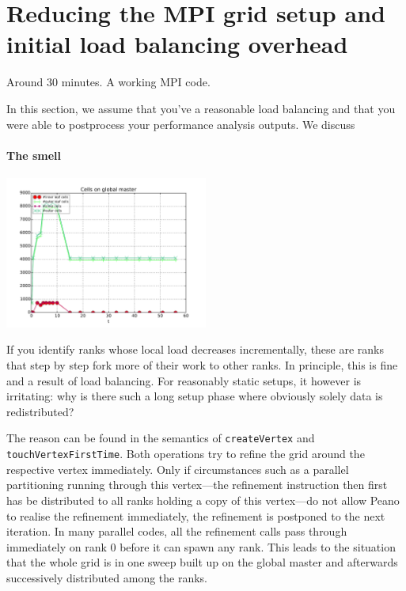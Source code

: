 \section{Reducing the MPI grid setup and initial load balancing overhead}


\chapterDescription
  {
    Around 30 minutes.
  }
  {
    A working MPI code.
  }


In this section, we assume that you've a reasonable load balancing and that you
were able to postprocess your performance analysis outputs. We discuss 


\paragraph{The smell}

\begin{center}
  \includegraphics[width=0.5\textwidth]{41_mpi-setup/performance-analysis-output.pdf}
\end{center}



If you identify ranks whose local load decreases incrementally, these are ranks
that step by step fork more of their work to other ranks. 
In principle, this is fine and a result of load balancing. 
For reasonably static setups, it however is irritating: 
why is there such a long setup phase where obviously solely data is
redistributed?

The reason can be found in the semantics of \texttt{createVertex} and
\texttt{touchVertexFirstTime}.
Both operations try to refine the grid around the respective vertex immediately. 
Only if circumstances such as a parallel partitioning running through this
vertex---the refinement instruction then first has be distributed to all ranks
holding a copy of this vertex---do not allow Peano to realise the refinement
immediately, the refinement is postponed to the next iteration.
In many parallel codes, all the refinement calls pass through immediately on
rank 0 before it can spawn any rank.
This leads to the situation that the whole grid is in one sweep built up on the
global master and afterwards successively distributed among the ranks.


